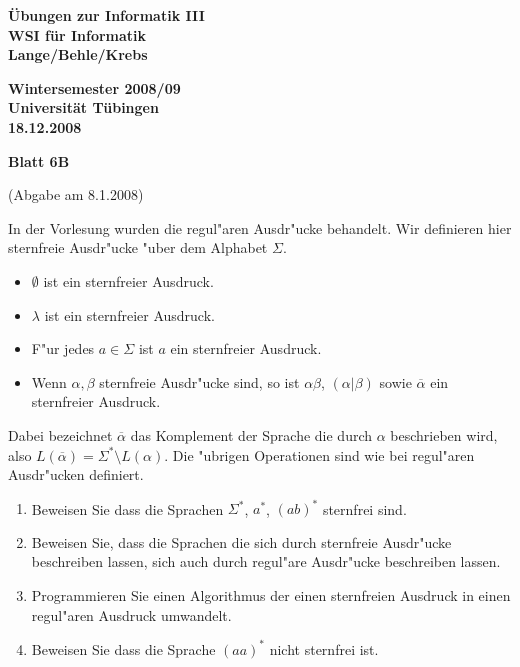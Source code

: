 \documentclass[a4paper]{article}
\def\header#1#2#3{\pagestyle{empty}
\noindent
\begin{minipage}[t]{0.6\textwidth}
\begin{flushleft}
\bf \"Ubungen zur Informatik III\\
WSI f\"ur Informatik\\
Lange/Behle/Krebs
\end{flushleft}
\end{minipage}
\begin{minipage}[t]{0.4\textwidth}
\begin{flushright}
\bf Wintersemester 2008/09\\
Universit\"at T\"ubingen\\
#2 %
\end{flushright}
\end{minipage}

\begin{center}
{\Large\bf Blatt #1}

{(Abgabe am #3)}
\end{center}
\bigskip
}
\begin{document}
\header{6B}{18.12.2008}{8.1.2008}

\bigskip
\begin{center}
\end{center}

\bigskip
In der Vorlesung wurden die regul"aren Ausdr"ucke behandelt. Wir definieren hier sternfreie Ausdr"ucke "uber dem Alphabet $\Sigma$.

\begin{itemize}
\item $\emptyset$ ist ein sternfreier Ausdruck.
\item $\lambda$ ist ein sternfreier Ausdruck.
\item F"ur jedes $a\in\Sigma$ ist $a$ ein sternfreier Ausdruck.
\item Wenn $\alpha,\beta$ sternfreie Ausdr"ucke sind, so ist $\alpha\beta$, $(\alpha|\beta)$ sowie $\overline{\alpha}$ ein sternfreier Ausdruck.
\end{itemize}

Dabei bezeichnet $\overline{\alpha}$ das Komplement der Sprache die durch $\alpha$ beschrieben wird, also $L(\overline{\alpha})=\Sigma^*\setminus L(\alpha)$. Die "ubrigen Operationen sind wie bei regul"aren Ausdr"ucken definiert.

\begin{enumerate}
\item Beweisen Sie dass die Sprachen $\Sigma^*$, $a^*$, $(ab)^*$ sternfrei sind.
\item Beweisen Sie, dass die Sprachen die sich durch sternfreie Ausdr"ucke beschreiben lassen, sich auch durch regul"are Ausdr"ucke beschreiben lassen.
\item Programmieren Sie einen Algorithmus der einen sternfreien Ausdruck in einen regul"aren Ausdruck umwandelt.
\item Beweisen Sie dass die Sprache $(aa)^*$ nicht sternfrei ist.
\end{enumerate}
\end{document}
